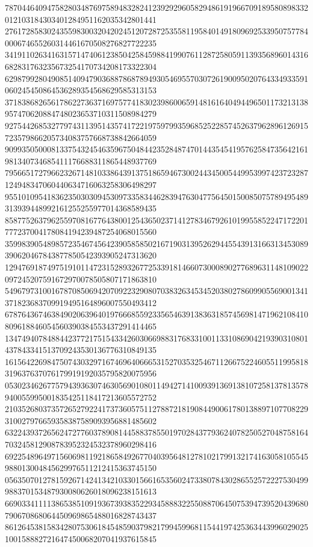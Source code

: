 \begin{DoxyCode}
      787044640947582803487697589483282412392929605829486191966709189580898332012103184303401284951162035342801441
      276172858302435598300320420245120728725355811958401491809692533950757784000674655260314461670508276827722235
      341911026341631571474061238504258459884199076112872580591139356896014316682831763235673254170734208173322304
      629879928049085140947903688786878949305469557030726190095020764334933591060245450864536289354568629585313153
      371838682656178622736371697577418302398600659148161640494496501173213138957470620884748023653710311508984279
      927544268532779743113951435741722197597993596852522857452637962896126915723579866205734083757668738842664059
      909935050008133754324546359675048442352848747014435454195762584735642161981340734685411176688311865448937769
      795665172796623267148103386439137518659467300244345005449953997423723287124948347060440634716063258306498297
      955101095418362350303094530973358344628394763047756450150085075789495489313939448992161255255977014368589435
      858775263796255970816776438001254365023714127834679261019955852247172201777237004178084194239487254068015560
      359983905489857235467456423905858502167190313952629445543913166313453089390620467843877850542393905247313620
      129476918749751910114723152893267725339181466073000890277689631148109022097245207591672970078505807171863810
      549679731001678708506942070922329080703832634534520380278609905569001341371823683709919495164896007550493412
      678764367463849020639640197666855923356546391383631857456981471962108410809618846054560390384553437291414465
      134749407848844237721751543342603066988317683310011331086904219390310801437843341513709243530136776310849135
      161564226984750743032971674696406665315270353254671126675224605511995818319637637076179919192035795820075956
      053023462677579439363074630569010801149427141009391369138107258137813578940055995001835425118417213605572752
      210352680373572652792241737360575112788721819084490061780138897107708229310027976659358387589093956881485602
      632243937265624727760378908144588378550197028437793624078250527048758164703245812908783952324532378960298416
      692254896497156069811921865849267704039564812781021799132174163058105545988013004845629976511212415363745150
      056350701278159267142413421033015661653560247338078430286552572227530499988370153487930080626018096238151613
      669033411113865385109193673938352293458883225508870645075394739520439680790670868064450969865488016828743437
      861264538158342807530618454859037982179945996811544197425363443996029025100158882721647450068207041937615845

\end{DoxyCode}
